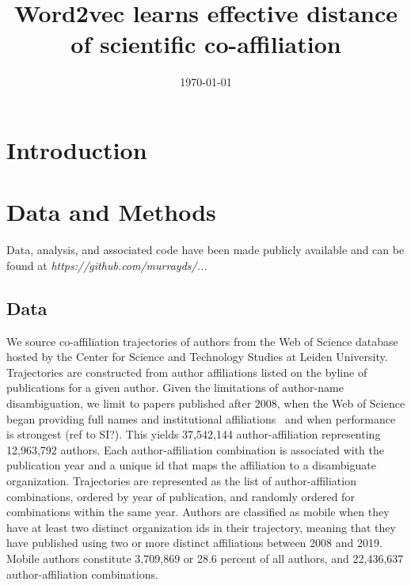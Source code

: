 \documentclass[12pt]{article} %
\begin{document}

\title{Word2vec learns effective distance of scientific co-affiliation} %
\date{\today}
\maketitle %

\section{Introduction}\label{sec:introduction} %



%
%
\section{Data and Methods}
\label{sec:datamethods} %

Data, analysis, and associated code have been made publicly available and can be found at \textit{https://github.com/murrayds/...}


\subsection*{Data}
We source co-affiliation trajectories of authors from the Web of Science database hosted by the Center for Science and Technology Studies at Leiden University. 
Trajectories are constructed from author affiliations listed on the byline of publications for a given author.
Given the limitations of author-name disambiguation, we limit to papers published after 2008, when the Web of Science began providing full names and institutional affiliations~\cite{caron2014disambiguation} and when performance is strongest (ref to SI?). 
This yields 37,542,144 author-affiliation representing 12,963,792 authors. 
Each author-affiliation combination is associated with the publication year and a unique id that maps the affiliation to a disambiguate organization. 
Trajectories are represented as the list of author-affiliation combinations, ordered by year of publication, and randomly ordered for combinations within the same year. 
Authors are classified as mobile when they have at least two distinct organization ids in their trajectory, meaning that they have published using two or more distinct affiliations between 2008 and 2019.
Mobile authors constitute 3,709,869 or 28.6 percent of all authors, and 22,436,637 author-affiliation combinations. 
\end{document}
